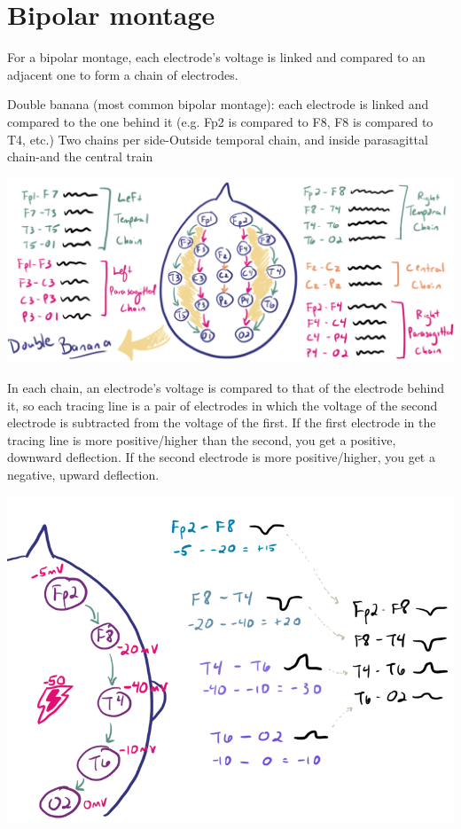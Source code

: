\documentclass[12pt]{article}
\begin{document}
\section{Bipolar montage} 
For a bipolar montage, each electrode’s voltage is linked and compared to an adjacent one to form a chain of electrodes.

Double banana (most common bipolar montage): each electrode is linked and compared to the one behind it (e.g. Fp2 is compared to F8, F8 is compared to T4, etc.) 
Two chains per side-Outside temporal chain, and inside parasagittal chain-and the central train 

\includegraphics[scale=0.4]{doubleBanana}

In each chain, an electrode’s voltage is compared to that of the electrode behind it, so each tracing line is a pair of electrodes in which the voltage of the second electrode is subtracted from the voltage of the first. 
If the first electrode in the tracing line is more positive/higher than the second, you get a positive, downward deflection.
If the second electrode is more positive/higher, you get a negative, upward deflection.

\includegraphics[scale=0.4]{BipolarSignalCreation}
\end{document}
